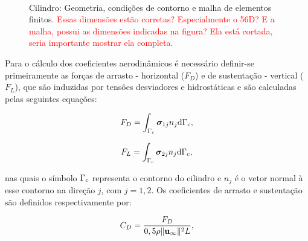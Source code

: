 \documentclass[tese_patricia]{subfiles}%
\begin{document}
\begin{figure}[!htb]
	\centering
	\\
	\caption{Cilindro: Geometria, condições de contorno e malha de elementos finitos. \textcolor{red}{Essas dimensões estão corretas? Especialmente o 56D? E a malha, possui as dimensões indicadas na figura? Ela está cortada, seria importante mostrar ela completa.} }
\end{figure}

Para o cálculo dos coeficientes aerodinâmicos é necessário definir-se primeiramente as forças de arrasto - horizontal ($F_D$) e de sustentação - vertical ($F_L$), que são induzidas por tensões desviadores e hidrostáticas e são calculadas pelas seguintes equações:

\begin{align}
F_D = \int_{\Gamma_{c}} \boldsymbol{\sigma}_{1j}n_{j} \mathrm{d}\Gamma_{c}, \label{eq:F_D}
\end{align}

\begin{align}
F_L = \int_{\Gamma_{c}} \boldsymbol{\sigma}_{2j}n_{j} \mathrm{d}\Gamma_{c},  \label{eq:F_L}
\end{align}

\noindent nas quais o símbolo $\Gamma_{c}$ representa o contorno do cilindro e $n_j$ é o vetor normal à esse contorno na direção $j$, com $j=1,2$. Os coeficientes de arrasto e sustentação são definidos respectivamente por:

\begin{align}
	C_D = \frac{F_D}{0,5\rho \lVert \mathbf{u}_{\infty} \lVert^{2} L},
\end{align}
\end{document}
